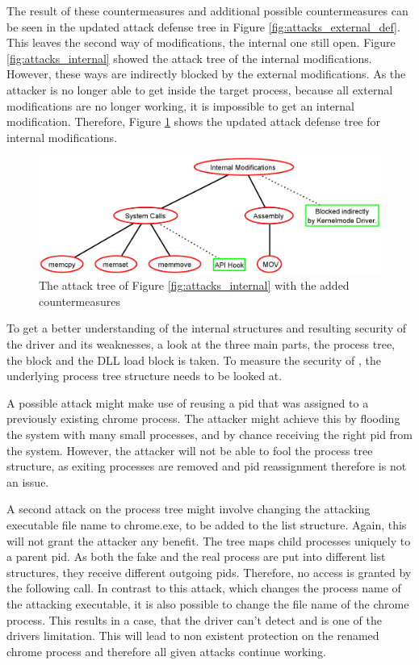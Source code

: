 The result of these countermeasures and additional possible countermeasures can be seen in the updated attack defense tree in Figure \ref{fig:attacks_external_def}. This leaves the second way of modifications, the internal one still open. Figure \ref{fig:attacks_internal} showed the attack tree of the internal modifications. However, these ways are indirectly blocked by the external modifications. As the attacker is no longer able to get inside the target process, because all external modifications are no longer working, it is impossible to get an internal modification. Therefore, Figure \ref{fig:attacks_internal_def} shows the updated attack defense tree for internal modifications.
\begin{figure}[h]
\centering
\includegraphics[scale=0.25]{sections/adtrees/InternalModifications.png}
\caption{The attack tree of Figure \ref{fig:attacks_internal} with the added countermeasures}
\label{fig:attacks_internal_def}
\end{figure}

To get a better understanding of the internal structures and resulting security of the driver and its weaknesses, a look at the three main parts, the process tree, the  block and the DLL load block is taken.
To measure the security of , the underlying process tree structure needs to be looked at. 

A possible attack might make use of reusing a pid that was assigned to a previously existing chrome process. The attacker might achieve this by flooding the system with many small processes, and by chance receiving the right pid from the system. However, the attacker will not be able to fool the process tree structure, as exiting processes are removed and pid reassignment therefore is not an issue. 

A second attack on the process tree might involve changing the attacking executable file name to chrome.exe, to be added to the list structure. Again, this will not grant the attacker any benefit. The tree maps child processes uniquely to a parent pid. As both the fake and the real process are put into different list structures, they receive different outgoing pids. Therefore, no access is granted by the following  call. In contrast to this attack, which changes the process name of the attacking executable, it is also possible to change the file name of the chrome process. This results in a case, that the driver can't detect and is one of the drivers limitation. This will lead to non existent protection on the renamed chrome process and therefore all given attacks continue working.

